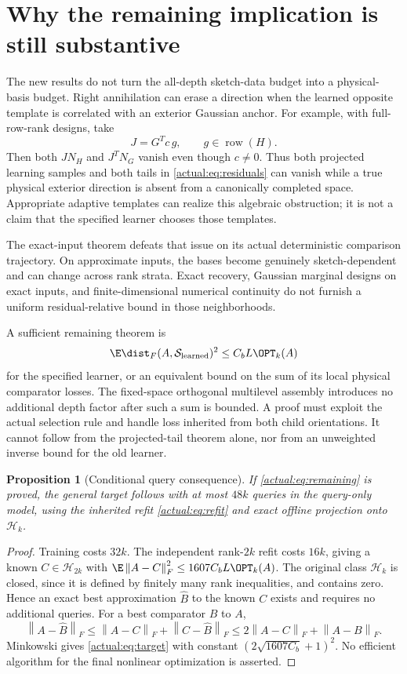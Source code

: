 \documentclass[11pt,oneside,openany,a4paper]{book}
\numberwithin{equation}{chapter}
\newtheorem{proposition}[theorem]{Proposition}
\theoremstyle{definition}
\theoremstyle{remark}
\newcommand{\F}[1]{\left\lVert#1\right\rVert_F}
\newcommand{\HH}{\mathcal H}\newcommand{\SSS}{\mathcal S}
\begin{document}
\section{Why the remaining implication is still substantive}
The new results do not turn the all-depth sketch-data budget into a physical-basis budget. Right annihilation can erase a direction when the learned opposite template is correlated with an exterior Gaussian anchor. For example, with full-row-rank designs, take
\[
 J=G^Tc\,g,\qquad g\in\operatorname{row}(H).
\]
Then both $J N_H$ and $J^T N_G$ vanish even though $c\ne0$. Thus both projected learning samples and both tails in \eqref{actual:eq:residuals} can vanish while a true physical exterior direction is absent from a canonically completed space. Appropriate adaptive templates can realize this algebraic obstruction; it is not a claim that the specified learner chooses those templates.

The exact-input theorem defeats that issue on its actual deterministic comparison trajectory. On approximate inputs, the bases become genuinely sketch-dependent and can change across rank strata. Exact recovery, Gaussian marginal designs on exact inputs, and finite-dimensional numerical continuity do not furnish a uniform residual-relative bound in those neighborhoods.

A sufficient remaining theorem is
\begin{equation}\label{actual:eq:remaining}
 \E\dist_F(A,\SSS_{\rm learned})^2
                 \le C_bL\OPT_k(A)
\end{equation}
for the specified learner, or an equivalent bound on the sum of its local physical comparator losses. The fixed-space orthogonal multilevel assembly introduces no additional depth factor after such a sum is bounded. A proof must exploit the actual selection rule and handle loss inherited from both child orientations. It cannot follow from the projected-tail theorem alone, nor from an unweighted inverse bound for the old learner.

\begin{proposition}[Conditional query consequence]\label{actual:prop:queries}
If \eqref{actual:eq:remaining} is proved, the general target follows with at most $48k$ queries in the query-only model, using the inherited refit \eqref{actual:eq:refit} and exact offline projection onto $\HH_k$.
\end{proposition}
\begin{proof}
Training costs $32k$. The independent rank-$2k$ refit costs $16k$, giving a known $C\in\HH_{2k}$ with
$\E\F{A-C}^2\le1607C_bL\OPT_k(A)$.
The original class $\HH_k$ is closed, since it is defined by finitely many rank inequalities, and contains zero. Hence an exact best approximation $\widehat B$ to the known $C$ exists and requires no additional queries. For a best comparator $B$ to $A$,
\[
 \F{A-\widehat B}\le\F{A-C}+\F{C-\widehat B}
                  \le2\F{A-C}+\F{A-B}.
\]
Minkowski gives \eqref{actual:eq:target} with constant
$(2\sqrt{1607C_b}+1)^2$. No efficient algorithm for the final nonlinear optimization is asserted.
\end{proof}
\end{document}
